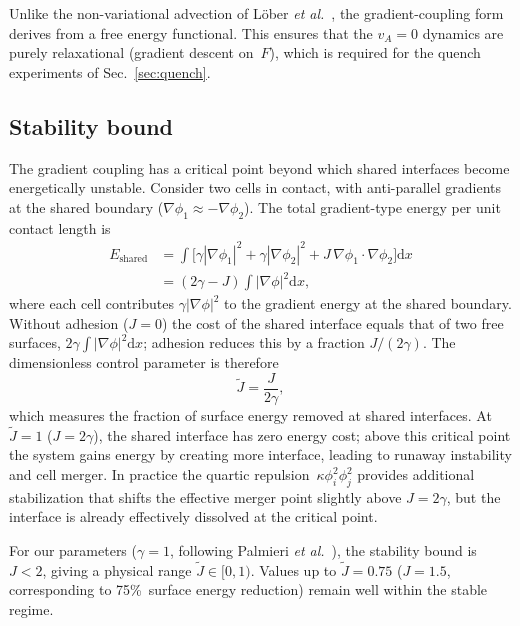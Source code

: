 \documentclass[aps,pre,twocolumn,superscriptaddress,longbibliography,floatfix]{revtex4-2}
\newcommand{\dd}{\mathrm{d}}               %
\newcommand{\vA}{v_{\!A}}                  %
\newcommand{\Jt}{\tilde{J}}               %
\newcommand{\phii}{\phi_i}                 %
\newcommand{\phij}{\phi_j}                 %
\begin{document}
Unlike the non-variational advection of L\"ober
\textit{et al.}~\cite{Lober2015}, the gradient-coupling form derives from
a free energy functional.  This ensures that the $\vA = 0$ dynamics are
purely relaxational (gradient descent on~$F$), which is
required for the quench experiments of
Sec.~\ref{sec:quench}.

\subsection{Stability bound}
\label{sec:model:stability}

The gradient coupling has a critical point beyond which shared
interfaces become energetically unstable.  Consider two cells in contact,
with anti-parallel gradients at the shared boundary
($\nabla\phi_1 \approx -\nabla\phi_2$).  The total gradient-type energy
per unit contact length is
%
\begin{align}
  E_{\mathrm{shared}} &= \int
    \bigl[\gamma|\nabla\phi_1|^2 + \gamma|\nabla\phi_2|^2
    + J\,\nabla\phi_1 \cdot \nabla\phi_2\bigr] \dd x
    \nonumber\\
  &= (2\gamma - J)\!\int\! |\nabla\phi|^2 \dd x,
  \label{eq:stability}
\end{align}
%
where each cell contributes $\gamma|\nabla\phi|^2$ to the gradient
energy at the shared boundary.  Without adhesion ($J = 0$) the cost
of the shared interface equals that of two free surfaces,
$2\gamma \int |\nabla\phi|^2 \dd x$; adhesion reduces this by a
fraction $J/(2\gamma)$.  The dimensionless control parameter is
therefore
%
\begin{equation}
  \Jt = \frac{J}{2\gamma},
  \label{eq:Jtilde}
\end{equation}
%
which measures the fraction of surface energy removed at shared
interfaces.  At~$\Jt = 1$ ($J = 2\gamma$), the shared interface
has zero energy cost; above this critical point the system gains energy
by creating more interface, leading to runaway instability and cell
merger.  In practice the quartic repulsion~$\kappa \phii^2 \phij^2$
provides additional stabilization that shifts the effective merger point
slightly above $J = 2\gamma$, but the interface is already effectively
dissolved at the critical point.

For our parameters ($\gamma = 1$, following Palmieri
\textit{et al.}~\cite{Palmieri2015}), the stability bound is
$J < 2$, giving a physical range $\Jt \in [0, 1)$.  Values up
to $\Jt = 0.75$ ($J = 1.5$, corresponding to 75\%\ surface
energy reduction) remain well within the stable regime.
\end{document}

